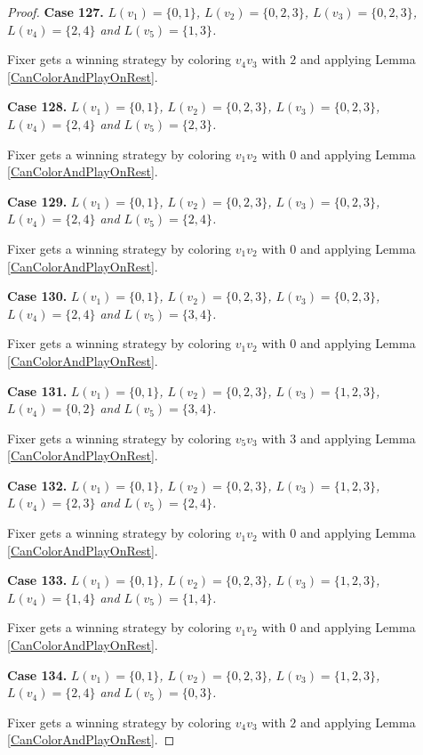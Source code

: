 \documentclass[12pt]{amsart}
\theoremstyle{plain}
\theoremstyle{definition}
\theoremstyle{remark}
\begin{document}
\begin{proof}
\noindent\textbf{Case 127.  }\textit{$L(v_1) = \{0, 1\}$, $L(v_2) = \{0, 2, 3\}$, $L(v_3) = \{0, 2, 3\}$, $L(v_4) = \{2, 4\}$ and $L(v_5) = \{1, 3\}$.}

Fixer gets a winning strategy by coloring $v_4v_3$ with $2$ and applying Lemma \ref{CanColorAndPlayOnRest}.

\noindent\textbf{Case 128.  }\textit{$L(v_1) = \{0, 1\}$, $L(v_2) = \{0, 2, 3\}$, $L(v_3) = \{0, 2, 3\}$, $L(v_4) = \{2, 4\}$ and $L(v_5) = \{2, 3\}$.}

Fixer gets a winning strategy by coloring $v_1v_2$ with $0$ and applying Lemma \ref{CanColorAndPlayOnRest}.

\noindent\textbf{Case 129.  }\textit{$L(v_1) = \{0, 1\}$, $L(v_2) = \{0, 2, 3\}$, $L(v_3) = \{0, 2, 3\}$, $L(v_4) = \{2, 4\}$ and $L(v_5) = \{2, 4\}$.}

Fixer gets a winning strategy by coloring $v_1v_2$ with $0$ and applying Lemma \ref{CanColorAndPlayOnRest}.

\noindent\textbf{Case 130.  }\textit{$L(v_1) = \{0, 1\}$, $L(v_2) = \{0, 2, 3\}$, $L(v_3) = \{0, 2, 3\}$, $L(v_4) = \{2, 4\}$ and $L(v_5) = \{3, 4\}$.}

Fixer gets a winning strategy by coloring $v_1v_2$ with $0$ and applying Lemma \ref{CanColorAndPlayOnRest}.

\noindent\textbf{Case 131.  }\textit{$L(v_1) = \{0, 1\}$, $L(v_2) = \{0, 2, 3\}$, $L(v_3) = \{1, 2, 3\}$, $L(v_4) = \{0, 2\}$ and $L(v_5) = \{3, 4\}$.}

Fixer gets a winning strategy by coloring $v_5v_3$ with $3$ and applying Lemma \ref{CanColorAndPlayOnRest}.

\noindent\textbf{Case 132.  }\textit{$L(v_1) = \{0, 1\}$, $L(v_2) = \{0, 2, 3\}$, $L(v_3) = \{1, 2, 3\}$, $L(v_4) = \{2, 3\}$ and $L(v_5) = \{2, 4\}$.}

Fixer gets a winning strategy by coloring $v_1v_2$ with $0$ and applying Lemma \ref{CanColorAndPlayOnRest}.

\noindent\textbf{Case 133.  }\textit{$L(v_1) = \{0, 1\}$, $L(v_2) = \{0, 2, 3\}$, $L(v_3) = \{1, 2, 3\}$, $L(v_4) = \{1, 4\}$ and $L(v_5) = \{1, 4\}$.}

Fixer gets a winning strategy by coloring $v_1v_2$ with $0$ and applying Lemma \ref{CanColorAndPlayOnRest}.

\noindent\textbf{Case 134.  }\textit{$L(v_1) = \{0, 1\}$, $L(v_2) = \{0, 2, 3\}$, $L(v_3) = \{1, 2, 3\}$, $L(v_4) = \{2, 4\}$ and $L(v_5) = \{0, 3\}$.}

Fixer gets a winning strategy by coloring $v_4v_3$ with $2$ and applying Lemma \ref{CanColorAndPlayOnRest}.


\end{proof}
\end{document}
